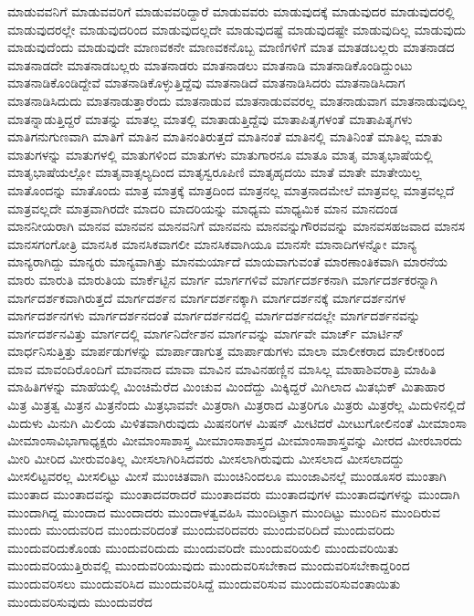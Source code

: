 {ಮಾಡುವವನಿಗೆ
ಮಾಡುವವರಿಗೆ
ಮಾಡುವವರಿದ್ದಾರೆ
ಮಾಡುವವರು
ಮಾಡುವುದಕ್ಕೆ
ಮಾಡುವುದರ
ಮಾಡುವುದರಲ್ಲಿ
ಮಾಡುವುದರಲ್ಲೇ
ಮಾಡುವುದರಿಂದ
ಮಾಡುವುದಲ್ಲದೇ
ಮಾಡುವುದಷ್ಟೆ
ಮಾಡುವುದಷ್ಟೇ
ಮಾಡುವುದಿಲ್ಲ
ಮಾಡುವುದು
ಮಾಡುವುದೆಂದು
ಮಾಡುವುದೇ
ಮಾಣವಕನೇ
ಮಾಣವಕನೊಬ್ಬ
ಮಾಣಿಗಳಿಗೆ
ಮಾತ
ಮಾತಡಬಲ್ಲರು
ಮಾತನಾಡದ
ಮಾತನಾಡದೇ
ಮಾತನಾಡಬಲ್ಲರು
ಮಾತನಾಡರು
ಮಾತನಾಡಲು
ಮಾತನಾಡಿ
ಮಾತನಾಡಿಕೊಂಡಿದ್ದುಂಟು
ಮಾತನಾಡಿಕೊಂಡಿದ್ದೇವೆ
ಮಾತನಾಡಿಕೊಳ್ಳುತ್ತಿದ್ದೆವು
ಮಾತನಾಡಿದೆ
ಮಾತನಾಡಿಸಿದರು
ಮಾತನಾಡಿಸಿದಾಗ
ಮಾತನಾಡಿಸಿದುದು
ಮಾತನಾಡುತ್ತಾರೆಂದು
ಮಾತನಾಡುವ
ಮಾತನಾಡುವವರಲ್ಲ
ಮಾತನಾಡುವಾಗ
ಮಾತನಾಡುವುದಿಲ್ಲ
ಮಾತನ್ನಾಡುತ್ತಿದ್ದರೆ
ಮಾತನ್ನು
ಮಾತಲ್ಲ
ಮಾತಲ್ಲಿ
ಮಾತಾಡುತ್ತಿದ್ದೆವು
ಮಾತಾಪಿತೃಗಳಂತೆ
ಮಾತಾಪಿತೃಗಳು
ಮಾತಿಗನುಗುಣವಾಗಿ
ಮಾತಿಗೆ
ಮಾತಿನ
ಮಾತಿನಂತಿರುತ್ತದೆ
ಮಾತಿನಂತೆ
ಮಾತಿನಲ್ಲಿ
ಮಾತಿನಿಂತೆ
ಮಾತಿಲ್ಲ
ಮಾತು
ಮಾತುಗಳನ್ನು
ಮಾತುಗಳಲ್ಲಿ
ಮಾತುಗಳಿಂದ
ಮಾತುಗಳು
ಮಾತುಗಾರನೂ
ಮಾತೂ
ಮಾತೃ
ಮಾತೃಭಾಷೆಯಲ್ಲಿ
ಮಾತೃಭಾಷೆಯಲ್ಲೋ
ಮಾತೃವಾತ್ಸಲ್ಯದಿಂದ
ಮಾತೃಸ್ವರೂಪಿಣಿ
ಮಾತೃಹೃದಯಿ
ಮಾತೆ
ಮಾತೇ
ಮಾತೇಯಿಲ್ಲ
ಮಾತೊಂದನ್ನು
ಮಾತೊಂದು
ಮಾತ್ರ
ಮಾತ್ರಕ್ಕೆ
ಮಾತ್ರದಿಂದ
ಮಾತ್ರನಲ್ಲ
ಮಾತ್ರನಾದಮೇಲೆ
ಮಾತ್ರವಲ್ಲ
ಮಾತ್ರವಲ್ಲದೆ
ಮಾತ್ರವಲ್ಲದೇ
ಮಾತ್ರವಾಗಿರದೇ
ಮಾದರಿ
ಮಾದರಿಯನ್ನು
ಮಾಧ್ಯಮ
ಮಾಧ್ಯಮಿಕ
ಮಾನ
ಮಾನದಂಡ
ಮಾನನೀಯರಾಗಿ
ಮಾನವ
ಮಾನವನ
ಮಾನವನಿಗೆ
ಮಾನವನು
ಮಾನವನ್ನುಗೌರವವನ್ನು
ಮಾನವಸಹಜವಾದ
ಮಾನಸ
ಮಾನಸಗಂಗೋತ್ರಿ
ಮಾನಸಿಕ
ಮಾನಸಿಕವಾಗಲೀ
ಮಾನಸಿಕವಾಗಿಯೂ
ಮಾನಸೇ
ಮಾನಾದಿಗಳನ್ನೋ
ಮಾನ್ಯ
ಮಾನ್ಯರಾಗಿದ್ದು
ಮಾನ್ಯರು
ಮಾನ್ಯವಾಗಿತ್ತು
ಮಾನಮರ್ಯಾದೆ
ಮಾಯವಾಗುವಂತೆ
ಮಾರಣಾಂತಿಕವಾಗಿ
ಮಾರನೆಯ
ಮಾರು
ಮಾರುತಿ
ಮಾರುತಿಯ
ಮಾರ್ಕೆಟ್ಟಿನ
ಮಾರ್ಗ
ಮಾರ್ಗಗಳಿವೆ
ಮಾರ್ಗದರ್ಶಕನಾಗಿ
ಮಾರ್ಗದರ್ಶಕರನ್ನಾಗಿ
ಮಾರ್ಗದರ್ಶಕವಾಗಿರುತ್ತದೆ
ಮಾರ್ಗದರ್ಶನ
ಮಾರ್ಗದರ್ಶನಕ್ಕಾಗಿ
ಮಾರ್ಗದರ್ಶನಕ್ಕೆ
ಮಾರ್ಗದರ್ಶನಗಳ
ಮಾರ್ಗದರ್ಶನಗಳು
ಮಾರ್ಗದರ್ಶನದಂತೆ
ಮಾರ್ಗದರ್ಶನದಲ್ಲಿ
ಮಾರ್ಗದರ್ಶನದಲ್ಲೇ
ಮಾರ್ಗದರ್ಶನವನ್ನು
ಮಾರ್ಗದರ್ಶನವಿತ್ತು
ಮಾರ್ಗದಲ್ಲಿ
ಮಾರ್ಗನಿರ್ದೇಶನ
ಮಾರ್ಗವನ್ನು
ಮಾರ್ಗವೇ
ಮಾರ್ಚ್
ಮಾರ್ಟಿನ್
ಮಾರ್ಧನಿಸುತ್ತಿತ್ತು
ಮಾರ್ಪಡುಗಳನ್ನು
ಮಾರ್ಪಾಡಾಗುತ್ತ
ಮಾರ್ಪಾಡುಗಳು
ಮಾಲಾ
ಮಾಲೀಕರಾದ
ಮಾಲೀಕರಿಂದ
ಮಾವ
ಮಾವಂದಿರೊಂದಿಗೆ
ಮಾವನಾದ
ಮಾವಾ
ಮಾವಿನ
ಮಾವಿನಹಣ್ಣಿನ
ಮಾಸಿಲ್ಲ
ಮಾಹಾಶಿವರಾತ್ರಿ
ಮಾಹಿತಿ
ಮಾಹಿತಿಗಳನ್ನು
ಮಾಹೆಯಲ್ಲಿ
ಮಿಂಚಿಮೆರೆದ
ಮಿಂಚುವ
ಮಿಂದೆದ್ದು
ಮಿಕ್ಕಿದ್ದರೆ
ಮಿಗಿಲಾದ
ಮಿತಭುಕ್
ಮಿತಾಹಾರ
ಮಿತ್ರ
ಮಿತ್ರತ್ವ
ಮಿತ್ರನ
ಮಿತ್ರನೆಂದು
ಮಿತ್ರಭಾವವೇ
ಮಿತ್ರರಾಗಿ
ಮಿತ್ರರಾದ
ಮಿತ್ರರಿಗೂ
ಮಿತ್ರರು
ಮಿತ್ರರೆಲ್ಲ
ಮಿದುಳಿನಲ್ಲಿದೆ
ಮಿದುಳು
ಮಿನುಗಿ
ಮಿಲಿಯ
ಮಿಳಿತವಾಗಿರುವುದು
ಮಿಷನರಿಗಳ
ಮಿಷನ್
ಮೀಟಿದರೆ
ಮೀಟುಗೋಲಿನಂತೆ
ಮೀಮಾಂಸಾ
ಮೀಮಾಂಸಾವಿಭಾಗಾಧ್ಯಕ್ಷರು
ಮೀಮಾಂಸಾಶಾಸ್ತ್ರ
ಮೀಮಾಂಸಾಶಾಸ್ತ್ರದ
ಮೀಮಾಂಸಾಶಾಸ್ತ್ರವನ್ನು
ಮೀರದ
ಮೀರಬಾರದು
ಮೀರಿ
ಮೀರಿದ
ಮೀರುವಂತಿಲ್ಲ
ಮೀಸಲಾಗಿರಿಸಿದವರು
ಮೀಸಲಾಗಿರುವುದು
ಮೀಸಲಾದ
ಮೀಸಲಾದದ್ದು
ಮೀಸಲಿಟ್ಟವರಲ್ಲ
ಮೀಸಲಿಟ್ಟು
ಮೀಸೆ
ಮುಂಚಿತವಾಗಿ
ಮುಂಚಿನಿಂದಲೂ
ಮುಂಜಾವಿನಲ್ಲೆ
ಮುಂಡೂಸರ
ಮುಂತಾಗಿ
ಮುಂತಾದ
ಮುಂತಾದವನ್ನು
ಮುಂತಾದವರಾದರೆ
ಮುಂತಾದವರು
ಮುಂತಾದವುಗಳ
ಮುಂತಾದವುಗಳನ್ನು
ಮುಂದಾಗಿ
ಮುಂದಾಗಿದ್ದ
ಮುಂದಾದ
ಮುಂದಾದರು
ಮುಂದಾಳತ್ವವಹಿಸಿ
ಮುಂದಿಟ್ಟಾಗ
ಮುಂದಿಟ್ಟು
ಮುಂದಿನ
ಮುಂದಿರುವ
ಮುಂದು
ಮುಂದುವರಿದ
ಮುಂದುವರಿದಂತೆ
ಮುಂದುವರಿದವರು
ಮುಂದುವರಿದಿದೆ
ಮುಂದುವರಿದು
ಮುಂದುವರಿದುಕೊಂಡು
ಮುಂದುವರಿದುದು
ಮುಂದುವರಿದೇ
ಮುಂದುವರಿಯಲಿ
ಮುಂದುವರಿಯಿತು
ಮುಂದುವರಿಯುತ್ತಿರುವಲ್ಲಿ
ಮುಂದುವರಿಯುವುದು
ಮುಂದುವರಿಸಬೇಕಾದ
ಮುಂದುವರಿಸಬೇಕಾದ್ದರಿಂದ
ಮುಂದುವರಿಸಲು
ಮುಂದುವರಿಸಿದ
ಮುಂದುವರಿಸಿದ್ದೆ
ಮುಂದುವರಿಸುವ
ಮುಂದುವರಿಸುವಂತಾಯಿತು
ಮುಂದುವರಿಸುವುದು
ಮುಂದುವರೆದ
}
